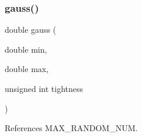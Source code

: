 \subsubsection{\texorpdfstring{gauss()}{gauss()}}
{\footnotesize\ttfamily double gauss (\begin{DoxyParamCaption}\item[{double}]{min,  }\item[{double}]{max,  }\item[{unsigned int}]{tightness }\end{DoxyParamCaption})}



References M\+A\+X\+\_\+\+R\+A\+N\+D\+O\+M\+\_\+\+N\+UM.


